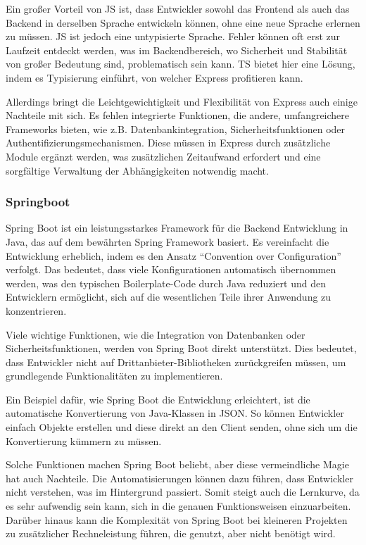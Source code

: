 \documentclass[biblatex]{lni}
\begin{document}
Ein großer Vorteil von \ac{JS} ist,
dass Entwickler sowohl das Frontend als auch das Backend in derselben Sprache entwickeln können,
ohne eine neue Sprache erlernen zu müssen.
\ac{JS} ist jedoch eine untypisierte Sprache.
Fehler können oft erst zur Laufzeit entdeckt werden, was im Backendbereich,
wo Sicherheit und Stabilität von großer Bedeutung sind, problematisch sein kann.
\ac{TS} bietet hier eine Lösung, indem es Typisierung einführt, von welcher Express profitieren kann. \cite{EX}

Allerdings bringt die Leichtgewichtigkeit und Flexibilität von Express auch einige Nachteile mit sich. \cite{EiA}
Es fehlen integrierte Funktionen, die andere, umfangreichere Frameworks bieten,
wie z.B. Datenbankintegration, Sicherheitsfunktionen oder Authentifizierungsmechanismen.
Diese müssen in Express durch zusätzliche Module ergänzt werden,
was zusätzlichen Zeitaufwand erfordert und eine sorgfältige Verwaltung der Abhängigkeiten notwendig macht.

\subsubsection{Springboot}

Spring Boot ist ein leistungsstarkes Framework für die Backend Entwicklung in Java,
das auf dem bewährten Spring Framework basiert. \cite{MED}
Es vereinfacht die Entwicklung erheblich, indem es den Ansatz “Convention over Configuration” verfolgt.
Das bedeutet, dass viele Konfigurationen automatisch übernommen werden,
was den typischen Boilerplate-Code durch Java reduziert und den Entwicklern ermöglicht,
sich auf die wesentlichen Teile ihrer Anwendung zu konzentrieren.

Viele wichtige Funktionen, wie die Integration von Datenbanken oder Sicherheitsfunktionen,
werden von Spring Boot direkt unterstützt. \cite{SPR}
Dies bedeutet, dass Entwickler nicht auf Drittanbieter-Bibliotheken zurückgreifen müssen,
um grundlegende Funktionalitäten zu implementieren.

Ein Beispiel dafür, wie Spring Boot die Entwicklung erleichtert, ist die automatische Konvertierung von Java-Klassen in \ac{JSON}.
So können Entwickler einfach Objekte erstellen und diese direkt an den Client senden, ohne sich um die Konvertierung kümmern zu müssen.

Solche Funktionen machen Spring Boot beliebt, aber diese vermeindliche Magie hat auch Nachteile. \cite{EiA}
Die Automatisierungen können dazu führen, dass Entwickler nicht verstehen, was im Hintergrund passiert.
Somit steigt auch die Lernkurve, da es sehr aufwendig sein kann, sich in die genauen Funktionsweisen einzuarbeiten.
Darüber hinaus kann die Komplexität von Spring Boot bei kleineren Projekten zu zusätzlicher Rechneleistung führen, die genutzt, aber nicht benötigt wird.
\end{document}
